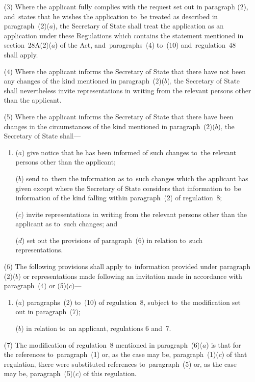 \documentclass[12pt,a4paper]{article}
\begin{document}
(3) Where the applicant fully complies with the request set out in paragraph
(2), and~states that he wishes the application to~be treated as described in
paragraph~(2)($a$), the Secretary of State shall treat the application as an
application under these Regulations which contains the statement mentioned in
section~28A(2)($a$) of the Act, and~paragraphs~(4) to~(10) and~regulation~48 shall
apply.

(4) Where the applicant informs the Secretary of State that there have not been
any changes of the kind mentioned in paragraph~(2)($b$), the Secretary of State
shall nevertheless invite representations in writing from the relevant persons
other than the applicant.

(5) Where the applicant informs the Secretary of State that there have been
changes in the circumstances of the kind mentioned in paragraph~(2)($b$), the
Secretary of State shall—
\begin{enumerate}\item[]
($a$) give notice that he has been informed of such changes to~the relevant persons
other than the applicant;

($b$) send to~them the information as to~such changes which the applicant has given
except where the Secretary of State considers that information to~be information
of the kind falling within paragraph~(2) of regulation~8;

($c$) invite representations in writing from the relevant persons other than the
applicant as to~such changes; and

($d$) set out the provisions of paragraph~(6) in relation to~such representations.
\end{enumerate}

(6) The following provisions shall apply to~information provided under paragraph
(2)($b$) or representations made following an invitation made in accordance with
paragraph~(4) or (5)($c$)—
\begin{enumerate}\item[]
($a$) paragraphs~(2) 
to~(10)  %
of regulation~8, subject to~the modification set out in paragraph~(7);

($b$) in relation to~an applicant, regulations 6 and~7.
\end{enumerate}

(7) The modification of regulation~8 mentioned in paragraph~(6)($a$) is that for
the references to~paragraph~(1) or, as the case may be, paragraph~(1)($c$) of that
regulation, there were substituted references to~paragraph~(5) or, as the case
may be, paragraph~(5)($c$) of this regulation.
\end{document}
